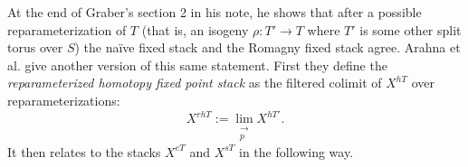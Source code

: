 \documentclass[12pt,dvipsnames]{amsart}
\begin{document}



At the end of Graber's section 2 in his note, he shows that after a possible reparameterization of \(T\) (that is, an isogeny \(\rho:T'\to T\) where \(T'\) is some other split torus over \(S\)) the na\"ive fixed stack and the Romagny fixed stack agree. Arahna et al. give another version of this same statement. First they define the \emph{reparameterized homotopy fixed point stack} as the filtered colimit of \(X^{hT}\) over reparameterizations:
\[X^{rhT} := \lim_{\substack{\to \\ p}} X^{hT'}.\]
It then relates to the stacks \(X^{eT}\) and \(X^{sT}\) in the following way.





\newpage

\printbibliography
\end{document}
